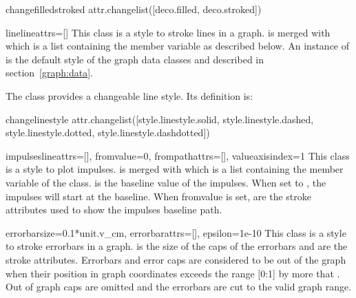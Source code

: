 \begin{memberdesc}{changefilledstroked}
  attr.changelist([deco.filled, deco.stroked])
\end{memberdesc} %

\begin{classdesc}{line}{lineattrs=[]} %
  This class is a style to stroke lines in a graph.
   is merged with  which is
  a list containing the member variable  as
  described below. An instance of  is the default style
  of the graph data classes  and 
  described in section~\ref{graph:data}.
\end{classdesc}

The class  provides a changeable line style. Its
definition is:

\begin{memberdesc}{changelinestyle}
  attr.changelist([style.linestyle.solid, style.linestyle.dashed, style.linestyle.dotted, style.linestyle.dashdotted])
\end{memberdesc} %

\begin{classdesc}{impulses}{lineattrs=[], fromvalue=0, %
                             frompathattrs=[], valueaxisindex=1}
  This class is a style to plot impulses.  is merged
  with  which is a list containing the member
  variable  of the  class.
   is the baseline value of the impulses. When set to
  , the impulses will start at the baseline. When fromvalue
  is set,  are the stroke attributes used to show
  the impulses baseline path.
\end{classdesc} %

\begin{classdesc}{errorbar}{size=0.1*unit.v\_cm, errorbarattrs=[], %
                            epsilon=1e-10}
  This class is a style to stroke errorbars in a graph.  is
  the size of the caps of the errorbars and  are
  the stroke attributes. Errorbars and error caps are considered to be
  out of the graph when their position in graph coordinates exceeds
  the range [0:1] by more that . Out of graph caps are
  omitted and the errorbars are cut to the valid graph range.
\end{classdesc} %

